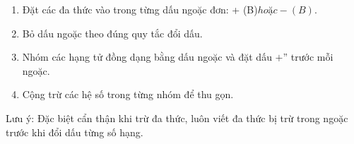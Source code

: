 \begin{enumerate}
\item Đặt các đa thức vào trong từng dấu ngoặc đơn:  + (B)$ hoặc  - (B)$.
\item Bỏ dấu ngoặc theo đúng quy tắc đổi dấu.
\item Nhóm các hạng tử đồng dạng bằng dấu ngoặc và đặt dấu $+$'' trước mỗi ngoặc.
\item Cộng trừ các hệ số trong từng nhóm để thu gọn.
\end{enumerate}
Lưu ý: Đặc biệt cẩn thận khi trừ đa thức, luôn viết đa thức bị trừ trong ngoặc trước khi đổi dấu từng số hạng.
